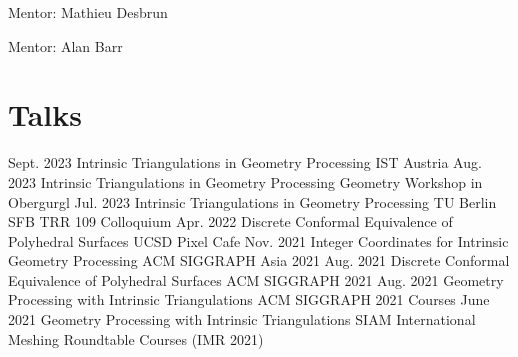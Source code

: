 \documentclass[11pt,letterpaper,roman]{moderncv}        %
\begin{document}
{Mentor: Mathieu Desbrun}
{} %

{Mentor: Alan Barr}
{}%



\section{Talks}
\cventry
    {Sept. 2023}
    {Intrinsic Triangulations in Geometry Processing}
    {IST Austria}{}{}
    {}
\cventry
    {Aug. 2023}
    {Intrinsic Triangulations in Geometry Processing}
    {Geometry Workshop in Obergurgl}{}{}
    {}
\cventry
    {Jul. 2023}
    {Intrinsic Triangulations in Geometry Processing}
    {TU Berlin SFB TRR 109 Colloquium}{}{}
    {}
\cventry
    {Apr. 2022}
    {Discrete Conformal Equivalence of Polyhedral Surfaces}
    {UCSD Pixel Cafe}{}{}
    {}
\cventry
    {Nov. 2021}
    {Integer Coordinates for Intrinsic Geometry Processing}
    {ACM SIGGRAPH Asia 2021}{}{}
    {}
\cventry
    {Aug. 2021}
    {Discrete Conformal Equivalence of Polyhedral Surfaces}
    {ACM SIGGRAPH 2021}{}{}
    {}
\cventry
    {Aug. 2021}
    {Geometry Processing with Intrinsic Triangulations}
    {ACM SIGGRAPH 2021 Courses}{}{}
    {}
\cventry
    {June 2021}
    {Geometry Processing with Intrinsic Triangulations}
    {SIAM International Meshing Roundtable Courses (IMR 2021)}{}{}
    {}
\end{document}
